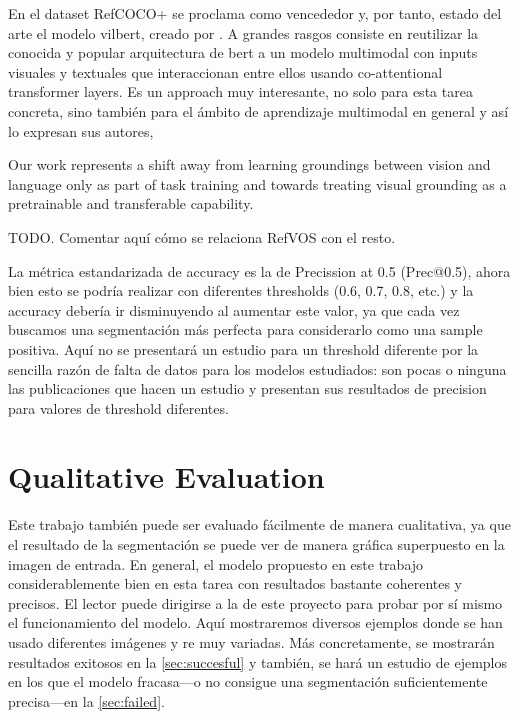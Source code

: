 En el dataset RefCOCO+ se proclama como vencededor y, por tanto, estado del
arte el modelo \gls{vilbert}, creado por . A grandes rasgos
consiste en reutilizar la conocida y popular arquitectura de \gls{bert} a un
modelo multimodal con inputs visuales y textuales que interaccionan entre ellos
usando co-attentional transformer layers. Es un approach muy interesante, no
solo para esta tarea concreta, sino también para el ámbito de aprendizaje
multimodal en general y así lo expresan sus autores,

\begin{quoteBox}
  Our work represents a shift away from learning groundings between vision and
  language only as part of task training and towards treating visual grounding
  as a pretrainable and transferable capability.
  \tcblower{}
\end{quoteBox}

TODO. Comentar aquí cómo se relaciona RefVOS con el resto.

La métrica estandarizada de accuracy es la de Precission at 0.5 (Prec@0.5),
ahora bien esto se podría realizar con diferentes thresholds (0.6, 0.7, 0.8,
etc.) y la accuracy debería ir disminuyendo al aumentar este valor, ya que cada
vez buscamos una segmentación más perfecta para considerarlo como una sample
positiva. Aquí no se presentará un estudio para un threshold diferente por la
sencilla razón de falta de datos para los modelos estudiados: son pocas o
ninguna las publicaciones que hacen un estudio y presentan sus resultados de
precision para valores de threshold diferentes.


\section{Qualitative Evaluation}\label{sec:qualitative-eval-res}

Este trabajo también puede ser evaluado fácilmente de manera cualitativa, ya
que el resultado de la segmentación se puede ver de manera gráfica superpuesto
en la imagen de entrada. En general, el modelo propuesto en este trabajo
considerablemente bien en esta tarea con resultados bastante coherentes y
precisos. El lector puede dirigirse a la
 de este proyecto para probar
por sí mismo el funcionamiento del modelo. Aquí mostraremos diversos ejemplos
donde se han usado diferentes imágenes y \gls{re} muy variadas. Más
concretamente, se mostrarán resultados exitosos en la \vref{sec:succesful} y
también, se hará un estudio de ejemplos en los que el modelo fracasa---o no
consigue una segmentación suficientemente precisa---en la \vref{sec:failed}.


